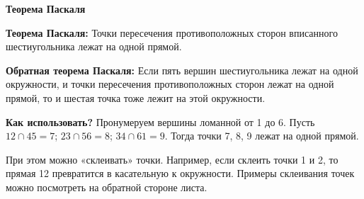 \documentclass{article}
\begin{document}
\large
	
	\begin{center}
		\textbf{Теорема Паскаля}
	\end{center}
	
	\textbf{Теорема Паскаля:} Точки пересечения противоположных сторон вписанного шестиугольника лежат на одной прямой.
	
	\textbf{Обратная теорема Паскаля:} Если пять вершин шестиугольника лежат на одной окружности, и точки пересечения противоположных сторон лежат на одной прямой, то и шестая точка тоже лежит на этой окружности.
	
	\textbf{Как использовать?} Пронумеруем вершины ломанной от 1 до 6. Пусть 
	$12 \cap 45 = 7$; $23 \cap 56 = 8$; $34 \cap 61 = 9$. Тогда точки 7, 8, 9 лежат на одной прямой.
	
	При этом можно «склеивать» точки. Например, если склеить точки 1 и 2, то прямая 12
	превратится в касательную к окружности.
	Примеры склеивания точек можно посмотреть на обратной стороне листа.
	
\end{document}
